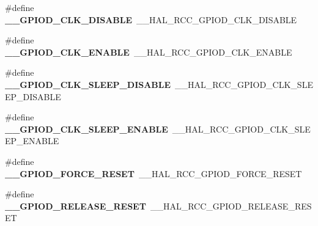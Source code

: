 \begin{DoxyCompactItemize}
\item 
\hypertarget{group___h_a_l___r_c_c___aliased_ga547bef54b61ffc8c9aabe04ace7bfa4d}{\#define {\bfseries \-\_\-\-\_\-\-G\-P\-I\-O\-D\-\_\-\-C\-L\-K\-\_\-\-D\-I\-S\-A\-B\-L\-E}~\-\_\-\-\_\-\-H\-A\-L\-\_\-\-R\-C\-C\-\_\-\-G\-P\-I\-O\-D\-\_\-\-C\-L\-K\-\_\-\-D\-I\-S\-A\-B\-L\-E}\label{group___h_a_l___r_c_c___aliased_ga547bef54b61ffc8c9aabe04ace7bfa4d}

\item 
\hypertarget{group___h_a_l___r_c_c___aliased_ga090d866663d7c82b7550745653e766e9}{\#define {\bfseries \-\_\-\-\_\-\-G\-P\-I\-O\-D\-\_\-\-C\-L\-K\-\_\-\-E\-N\-A\-B\-L\-E}~\-\_\-\-\_\-\-H\-A\-L\-\_\-\-R\-C\-C\-\_\-\-G\-P\-I\-O\-D\-\_\-\-C\-L\-K\-\_\-\-E\-N\-A\-B\-L\-E}\label{group___h_a_l___r_c_c___aliased_ga090d866663d7c82b7550745653e766e9}

\item 
\hypertarget{group___h_a_l___r_c_c___aliased_gaecd23b9cf109d1002f2d85891f2885fa}{\#define {\bfseries \-\_\-\-\_\-\-G\-P\-I\-O\-D\-\_\-\-C\-L\-K\-\_\-\-S\-L\-E\-E\-P\-\_\-\-D\-I\-S\-A\-B\-L\-E}~\-\_\-\-\_\-\-H\-A\-L\-\_\-\-R\-C\-C\-\_\-\-G\-P\-I\-O\-D\-\_\-\-C\-L\-K\-\_\-\-S\-L\-E\-E\-P\-\_\-\-D\-I\-S\-A\-B\-L\-E}\label{group___h_a_l___r_c_c___aliased_gaecd23b9cf109d1002f2d85891f2885fa}

\item 
\hypertarget{group___h_a_l___r_c_c___aliased_gab48888fe0fccfe2c3343571878163026}{\#define {\bfseries \-\_\-\-\_\-\-G\-P\-I\-O\-D\-\_\-\-C\-L\-K\-\_\-\-S\-L\-E\-E\-P\-\_\-\-E\-N\-A\-B\-L\-E}~\-\_\-\-\_\-\-H\-A\-L\-\_\-\-R\-C\-C\-\_\-\-G\-P\-I\-O\-D\-\_\-\-C\-L\-K\-\_\-\-S\-L\-E\-E\-P\-\_\-\-E\-N\-A\-B\-L\-E}\label{group___h_a_l___r_c_c___aliased_gab48888fe0fccfe2c3343571878163026}

\item 
\hypertarget{group___h_a_l___r_c_c___aliased_ga505e70975bc0901549f467aa9a606bfa}{\#define {\bfseries \-\_\-\-\_\-\-G\-P\-I\-O\-D\-\_\-\-F\-O\-R\-C\-E\-\_\-\-R\-E\-S\-E\-T}~\-\_\-\-\_\-\-H\-A\-L\-\_\-\-R\-C\-C\-\_\-\-G\-P\-I\-O\-D\-\_\-\-F\-O\-R\-C\-E\-\_\-\-R\-E\-S\-E\-T}\label{group___h_a_l___r_c_c___aliased_ga505e70975bc0901549f467aa9a606bfa}

\item 
\hypertarget{group___h_a_l___r_c_c___aliased_gadffaea7e6b49f7d50e4d0bff38d3a4da}{\#define {\bfseries \-\_\-\-\_\-\-G\-P\-I\-O\-D\-\_\-\-R\-E\-L\-E\-A\-S\-E\-\_\-\-R\-E\-S\-E\-T}~\-\_\-\-\_\-\-H\-A\-L\-\_\-\-R\-C\-C\-\_\-\-G\-P\-I\-O\-D\-\_\-\-R\-E\-L\-E\-A\-S\-E\-\_\-\-R\-E\-S\-E\-T}\label{group___h_a_l___r_c_c___aliased_gadffaea7e6b49f7d50e4d0bff38d3a4da}


\end{DoxyCompactItemize}
